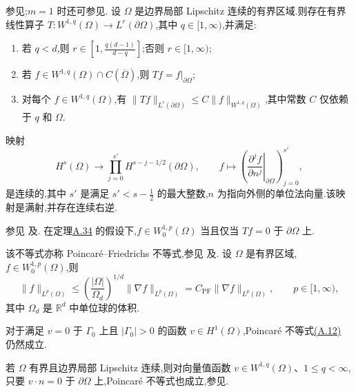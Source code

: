 \begin{theorem}[迹定理]\label{thm:appendix-a-34}
参见\textcite[定理 9.4]{LionsMagenes1972};$m=1$ 时还可参见\textcite[定理 II.4.1]{Galdi2011}.
设 $\Omega$ 是边界局部 Lipschitz 连续的有界区域.则存在有界线性算子 $T:W^{1,q}(\Omega)\to L^r(\partial\Omega)$,其中 $q\in[1,\infty)$,并满足:
\begin{enumerate}[label=(\roman*)]
 \item 若 $q<d$,则 $r\in\left[1,\frac{q(d-1)}{d-q}\right]$;否则 $r\in[1,\infty)$;
 \item 若 $f\in W^{1,q}(\Omega)\cap C(\overline\Omega)$,则 $Tf=f|_{\partial\Omega}$;
 \item 对每个 $f\in W^{1,q}(\Omega)$,有 $\|Tf\|_{L^r(\partial\Omega)}\le C\|f\|_{W^{1,q}(\Omega)}$,其中常数 $C$ 仅依赖于 $q$ 和 $\Omega$.
\end{enumerate}
映射
\begin{equation}\label{eq:appendix-a-11}
 H^s(\Omega)\longrightarrow\prod_{j=0}^{s'}H^{s-j-1/2}(\partial\Omega),
 \qquad f\longmapsto\left(\left.\frac{\partial^j f}{\partial n^j}\right|_{\partial\Omega}\right)_{j=0}^{s'},
\end{equation}
是连续的,其中 $s'$ 是满足 $s'<s-\tfrac12$ 的最大整数,$n$ 为指向外侧的单位法向量.该映射是满射,并存在连续右逆.
\end{theorem}

\begin{theorem}[零迹函数]\label{thm:appendix-a-35}
参见\textcite[定理 II.4.2]{Galdi2011} 及\textcite[第 273 页]{Evans2010}.
在定理\hyperref[thm:appendix-a-34]{A.34} 的假设下,$f\in W_0^{1,p}(\Omega)$ 当且仅当 $Tf=0$ 于 $\partial\Omega$ 上.
\end{theorem}

\begin{theorem}\label{thm:appendix-a-36}
该不等式亦称 Poincaré--Friedrichs 不等式,参见\textcite[定理 II.5.1]{Galdi2011} 及\textcite[第 164 页]{GilbargTrudinger1983}.
设 $\Omega$ 是有界区域,$f\in W_0^{1,p}(\Omega)$,则
\begin{equation}\label{eq:appendix-a-12}
 \|f\|_{L^p(\Omega)}\le\left(\frac{|\Omega|}{\Omega_d}\right)^{1/d}
 \|\nabla f\|_{L^p(\Omega)}=C_{\mathrm{PF}}\|\nabla f\|_{L^p(\Omega)},
 \qquad p\in[1,\infty),
\end{equation}
其中 $\Omega_d$ 是 $\mathbb R^d$ 中单位球的体积.
\end{theorem}

\begin{note}\label{note:appendix-a-37}
对于满足 $v=0$ 于 $\Gamma_0$ 上且 $|\Gamma_0|>0$ 的函数 $v\in H^1(\Omega)$,Poincaré 不等式\hyperref[eq:appendix-a-12]{(A.12)} 仍然成立.

若 $\Omega$ 有界且边界局部 Lipschitz 连续,则对向量值函数 $v\in W^{1,q}(\Omega)$、$1\le q<\infty$,只要 $v\cdot n=0$ 于 $\partial\Omega$ 上,Poincaré 不等式也成立,参见\textcite[第 II.4 节]{Galdi2000}.
\end{note}

